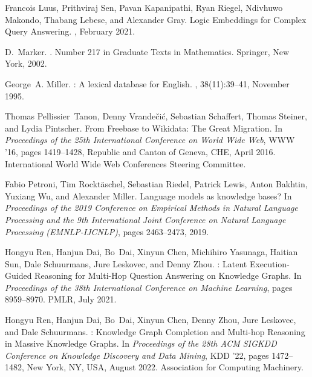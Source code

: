 \documentclass[11pt]{article}
\begin{document}
\begin{thebibliography}{10}
Francois Luus, Prithviraj Sen, Pavan Kapanipathi, Ryan Riegel, Ndivhuwo
  Makondo, Thabang Lebese, and Alexander Gray.
\newblock Logic {{Embeddings}} for {{Complex Query Answering}}.
, February 2021.

D.~Marker.
.
\newblock Number 217 in Graduate Texts in Mathematics. {Springer}, {New York},
  2002.

George~A. Miller.
: A lexical database for {{English}}.
, 38(11):39--41, November 1995.

Thomas Pellissier~Tanon, Denny Vrande{\v c}i{\'c}, Sebastian Schaffert, Thomas
  Steiner, and Lydia Pintscher.
\newblock From {{Freebase}} to {{Wikidata}}: {{The Great Migration}}.
\newblock In {\em Proceedings of the 25th {{International Conference}} on
  {{World Wide Web}}}, {{WWW}} '16, pages 1419--1428, {Republic and Canton of
  Geneva, CHE}, April 2016. {International World Wide Web Conferences Steering
  Committee}.

Fabio Petroni, Tim Rockt{\"a}schel, Sebastian Riedel, Patrick Lewis, Anton
  Bakhtin, Yuxiang Wu, and Alexander Miller.
\newblock Language models as knowledge bases?
\newblock In {\em Proceedings of the 2019 Conference on Empirical Methods in
  Natural Language Processing and the 9th International Joint Conference on
  Natural Language Processing (EMNLP-IJCNLP)}, pages 2463--2473, 2019.

Hongyu Ren, Hanjun Dai, Bo~Dai, Xinyun Chen, Michihiro Yasunaga, Haitian Sun,
  Dale Schuurmans, Jure Leskovec, and Denny Zhou.
: {{Latent Execution-Guided Reasoning}} for {{Multi-Hop
  Question Answering}} on {{Knowledge Graphs}}.
\newblock In {\em Proceedings of the 38th {{International Conference}} on
  {{Machine Learning}}}, pages 8959--8970. {PMLR}, July 2021.

Hongyu Ren, Hanjun Dai, Bo~Dai, Xinyun Chen, Denny Zhou, Jure Leskovec, and
  Dale Schuurmans.
: {{Knowledge Graph Completion}} and {{Multi-hop Reasoning}}
  in {{Massive Knowledge Graphs}}.
\newblock In {\em Proceedings of the 28th {{ACM SIGKDD Conference}} on
  {{Knowledge Discovery}} and {{Data Mining}}}, {{KDD}} '22, pages 1472--1482,
  {New York, NY, USA}, August 2022. {Association for Computing Machinery}.


\end{thebibliography}
\end{document}
